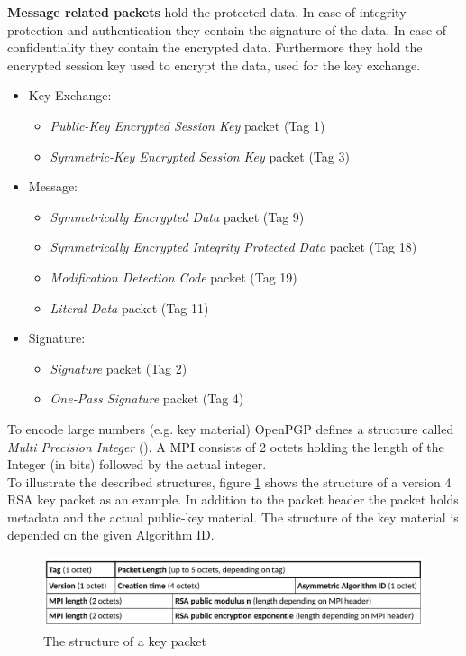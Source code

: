 \textbf{Message related packets} hold the protected data. In case of integrity protection and authentication they contain the signature of the data. In case of confidentiality they contain the encrypted data.
Furthermore they hold the encrypted session key used to encrypt the data, used for the key exchange.

\begin{itemize}
	\item Key Exchange:
	\begin{itemize}
		\item \textit{Public-Key Encrypted Session Key} packet (Tag 1)
		\item \textit{Symmetric-Key Encrypted Session Key} packet (Tag 3)
	\end{itemize}
	
	\item Message:
	\begin{itemize}
		\item \textit{Symmetrically Encrypted Data} packet (Tag 9)
		\item \textit{Symmetrically Encrypted Integrity Protected Data} packet (Tag 18)
		\item \textit{Modification Detection Code} packet (Tag 19)
		\item \textit{Literal Data} packet (Tag 11)
	\end{itemize}
	
	\item Signature:
	\begin{itemize}
		\item \textit{Signature} packet (Tag 2)
		\item \textit{One-Pass Signature} packet (Tag 4)
	\end{itemize}
\end{itemize}

To encode large numbers (e.g. key material) OpenPGP defines a structure called \textit{Multi Precision Integer} (). A MPI consists of 2 octets holding the length of the Integer (in bits) followed by the actual integer. \\


To illustrate the described structures, figure \ref{fig:packet-key} shows the structure of a version 4 RSA key packet as an example. In addition to the packet header the packet holds metadata and the actual public-key material. The structure of the key material is depended on the given Algorithm ID.

\begin{figure}[h!]
\centering
\includegraphics[width=1\linewidth]{figures/packet-key.png}
\caption[]{The structure of a key packet}
\label{fig:packet-key}
\end{figure}

